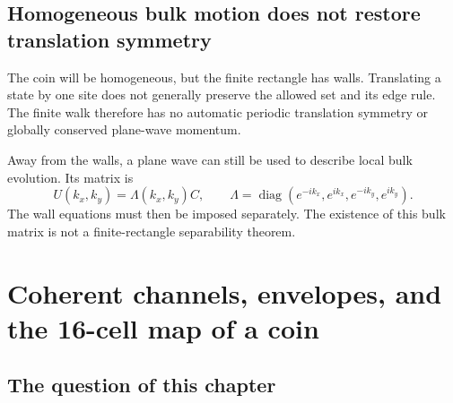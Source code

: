 \documentclass[11pt,a4paper,oneside]{report}
\newcommand{\diag}{\operatorname{diag}}
\numberwithin{equation}{chapter}
\begin{document}
\section{Homogeneous bulk motion does not restore translation symmetry}

The coin will be homogeneous, but the finite rectangle has walls.
Translating a state by one site does not generally preserve the allowed
set and its edge rule. The finite walk therefore has no automatic
periodic translation symmetry or globally conserved plane-wave momentum.

Away from the walls, a plane wave can still be used to describe local
bulk evolution. Its matrix is
\begin{equation}
U(k_x,k_y)=\Lambda(k_x,k_y)C,\qquad
\Lambda=\diag(e^{-ik_x},e^{ik_x},e^{-ik_y},e^{ik_y}).
\end{equation}
The wall equations must then be imposed separately. The existence of
this bulk matrix is not a finite-rectangle separability theorem.


\chapter{Coherent channels, envelopes, and the 16-cell map of a coin}
\label{ch:sixteen}

\section{The question of this chapter}
\end{document}
